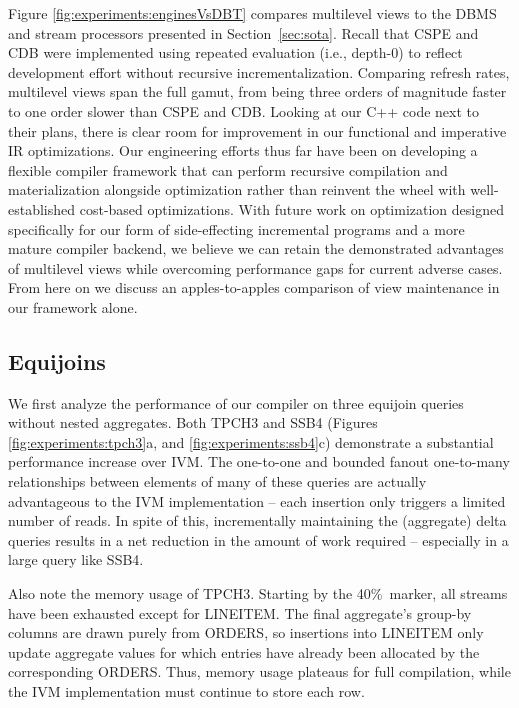 Figure \ref{fig:experiments:enginesVsDBT} compares multilevel views to the DBMS and stream processors presented in Section~\ref{sec:sota}.  Recall that CSPE and CDB were implemented using repeated evaluation (i.e., depth-0) to reflect development effort without recursive incrementalization.  Comparing refresh rates, multilevel views span the full gamut, from being three orders of magnitude faster to one order slower than CSPE and CDB. Looking at our C++ code next to their plans, there is clear room for improvement in our functional and imperative IR optimizations. Our engineering efforts thus far have been on developing a flexible compiler framework that can perform recursive compilation and materialization alongside optimization rather than reinvent the wheel with well-established cost-based optimizations. With future work on optimization designed specifically for our form of side-effecting incremental programs and a more mature compiler backend, we believe we can retain the demonstrated advantages of multilevel views while overcoming performance gaps for current adverse cases. From here on we discuss an apples-to-apples comparison of view maintenance in our framework alone.


\subsection{Equijoins}

We first analyze the performance of our compiler on three equijoin queries without nested aggregates.
Both TPCH3 and SSB4 (Figures \ref{fig:experiments:tpch3}a, and \ref{fig:experiments:ssb4}c) demonstrate a substantial performance increase over IVM.  The one-to-one and bounded fanout one-to-many relationships between elements of many of these queries are actually advantageous to the IVM implementation -- each insertion only triggers a limited number of reads.  In spite of this, incrementally maintaining the (aggregate) delta queries results in a net reduction in the amount of work required -- especially in a large query like SSB4.

Also note the memory usage of TPCH3.  Starting by the 40\%\ marker, all streams have been exhausted except for LINEITEM.  The final aggregate's group-by columns are drawn purely from ORDERS, so insertions into LINEITEM only update aggregate values for which entries have already been allocated by the corresponding ORDERS.  Thus, memory usage plateaus for full compilation, while the IVM implementation must continue to store each row.


